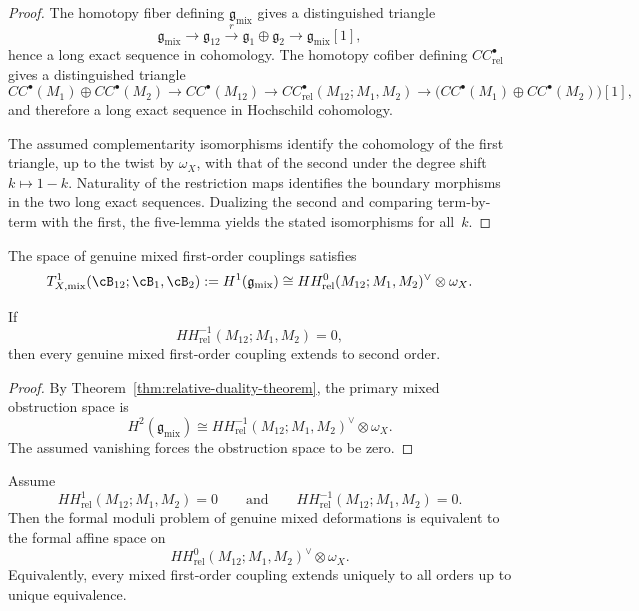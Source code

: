 \begin{proof}
The homotopy fiber defining $\mathfrak g_{\mathrm{mix}}$ gives a distinguished triangle
\[
\mathfrak g_{\mathrm{mix}} \to \mathfrak g_{12} \xrightarrow{r} \mathfrak g_1\oplus \mathfrak g_2 \to \mathfrak g_{\mathrm{mix}}[1],
\]
hence a long exact sequence in cohomology. The homotopy cofiber defining $CC^\bullet_{\mathrm{rel}}$ gives a distinguished triangle
\[
CC^\bullet(M_1)\oplus CC^\bullet(M_2)
\to CC^\bullet(M_{12})
\to CC^\bullet_{\mathrm{rel}}(M_{12};M_1,M_2)
\to
\big(CC^\bullet(M_1)\oplus CC^\bullet(M_2)\big)[1],
\]
and therefore a long exact sequence in Hochschild cohomology.

The assumed complementarity isomorphisms identify the cohomology of the first triangle, up to the twist by $\omega_X$, with that of the second under the degree shift $k\mapsto 1-k$. Naturality of the restriction maps identifies the boundary morphisms in the two long exact sequences. Dualizing the second and comparing term-by-term with the first, the five-lemma yields the stated isomorphisms for all~$k$.
\end{proof}

\begin{corollary}
\label{cor:relative-tangent-center-principle}
The space of genuine mixed first-order couplings satisfies
\[
T^1_{X,\mathrm{mix}}(\cB_{12};\cB_1,\cB_2)
:= H^1(\mathfrak g_{\mathrm{mix}})
\cong
HH^{0}_{\mathrm{rel}}(M_{12};M_1,M_2)^\vee\otimes \omega_X.
\]
\end{corollary}

\begin{corollary}
\label{cor:relative-dual-unobstructedness}
If
\[
HH^{-1}_{\mathrm{rel}}(M_{12};M_1,M_2)=0,
\]
then every genuine mixed first-order coupling extends to second order.
\end{corollary}

\begin{proof}
By Theorem~\ref{thm:relative-duality-theorem}, the primary mixed obstruction space is
\[
H^2(\mathfrak g_{\mathrm{mix}})
\cong
HH^{-1}_{\mathrm{rel}}(M_{12};M_1,M_2)^\vee\otimes \omega_X.
\]
The assumed vanishing forces the obstruction space to be zero.
\end{proof}

\begin{theorem}
\label{thm:relative-central-formality}
Assume
\[
HH^{1}_{\mathrm{rel}}(M_{12};M_1,M_2)=0
\qquad\text{and}\qquad
HH^{-1}_{\mathrm{rel}}(M_{12};M_1,M_2)=0.
\]
Then the formal moduli problem of genuine mixed deformations is equivalent to the formal affine space on
\[
HH^{0}_{\mathrm{rel}}(M_{12};M_1,M_2)^\vee\otimes \omega_X.
\]
Equivalently, every mixed first-order coupling extends uniquely to all orders up to unique equivalence.
\end{theorem}

